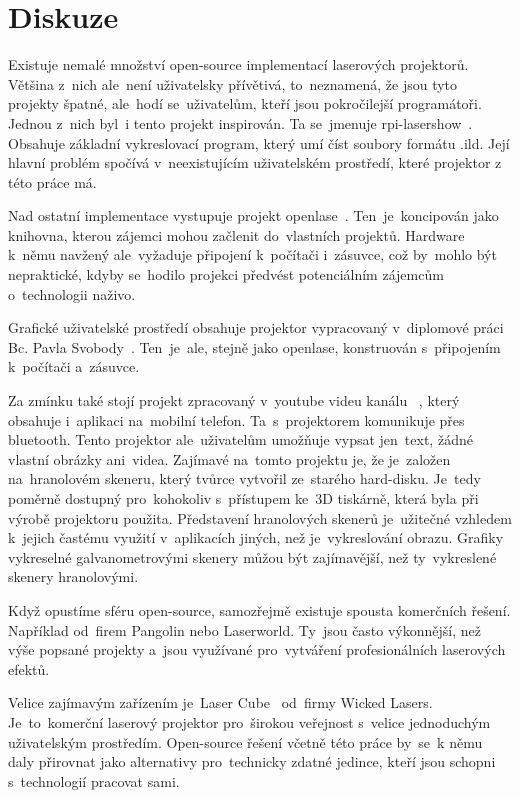 \chapter*{Diskuze}

Existuje nemalé množství open-source implementací laserových projektorů.
Většina z~nich ale~není uživatelsky přívětivá, to~neznamená, že jsou tyto projekty špatné, ale~hodí se~uživatelům, kteří jsou pokročilejší programátoři. 
Jednou z~nich byl~i tento projekt inspirován.
Ta se~jmenuje rpi-lasershow~\cite{rpi-lasershow}. Obsahuje základní vykreslovací program, který umí číst soubory formátu .ild. Její hlavní problém spočívá v~neexistujícím uživatelském prostředí, které projektor z této práce má.

Nad ostatní implementace vystupuje projekt openlase~\cite{openlase}. Ten~je~koncipován jako knihovna, kterou zájemci mohou začlenit do~vlastních projektů.
Hardware k~němu navžený ale~vyžaduje připojení k~počítači i~zásuvce, což by~mohlo být nepraktické, kdyby se~hodilo projekci předvést potenciálním zájemcům o~technologii naživo.

Grafické uživatelské prostředí obsahuje projektor vypracovaný v~diplomové práci Bc. Pavla Svobody~\cite{vut-chabr}. Ten~je~ale, stejně jako openlase, konstruován s~připojením k~počítači a~zásuvce.

Za zmínku také stojí projekt zpracovaný v~youtube videu kanálu ~\cite{harddrive-projector-youtube}, který obsahuje i~aplikaci na~mobilní telefon. Ta~s~projektorem komunikuje přes bluetooth. Tento projektor ale~uživatelům umožňuje vypsat jen~text, žádné vlastní obrázky ani~videa.
Zajímavé na~tomto projektu je, že je~založen na~hranolovém skeneru, který tvůrce vytvořil ze~starého hard-disku. Je~tedy poměrně dostupný pro~kohokoliv s~přístupem ke~3D tiskárně, která byla při výrobě projektoru použita.
Představení hranolových skenerů je~užitečné vzhledem k~jejich častému využití v~aplikacích jiných, než je~vykreslování obrazu. Grafiky vykreselné galvanometrovými skenery můžou být zajímavější, než ty~vykreslené skenery hranolovými.

Když opustíme sféru open-source, samozřejmě existuje spousta komerčních řešení. Například od~firem Pangolin nebo Laserworld. Ty~jsou často výkonnější, než výše popsané projekty a~jsou využívané pro~vytváření profesionálních laserových efektů.

Velice zajímavým zařízením je~Laser Cube~\cite{lasercube} od~firmy Wicked Lasers. Je~to~komerční laserový projektor pro~širokou veřejnost s~velice jednoduchým uživatelským prostředím. Open-source řešení včetně této práce by~se~k němu daly přirovnat jako alternativy pro~technicky zdatné jedince, kteří jsou schopni s~technologií pracovat sami.

